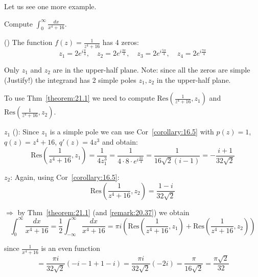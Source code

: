 Let us see one more example.
\begin{example}\label{example:24.2}
    Compute $\int_0^{\infty} \frac{dx}{x^4 + 16}$.
    
    \begin{soln}
    
    (\verifythis) The function $f(z) = \frac{1}{z^4 + 16}$ has 4 zeros:
\[
z_1 = 2e^{i \frac{\pi}{4}}, \quad z_2 = 2e^{i \frac{3\pi}{4}}, \quad z_3 = 2e^{i \frac{5\pi}{4}}, \quad z_4 = 2e^{i \frac{7\pi}{4}}
\]

Only $z_1$ and $z_2$ are in the upper-half plane. Note: since all the zeros are simple (Justify!) the integrand has 2 simple poles $z_1, z_2$ in the upper-half plane.

To use Thm~\ref{theorem:21.1} we need to compute $\text{Res} \left( \frac{1}{z^4 + 16}, z_1 \right)$ and $\text{Res} \left( \frac{1}{z^4 + 16}, z_2 \right)$.

$z_1$ (\verifythis): Since $z_1$ is a simple pole we can use Cor~\ref{corollary:16.5} with $p(z) = 1$, $q(z) = z^4 + 16$, $q'(z) = 4z^3$ and obtain:
\[
\text{Res} \left( \frac{1}{z^4 + 16}, z_1 \right) = \frac{1}{4z_1^3} = \frac{1}{4 \cdot 8 \cdot e^{i \frac{3\pi}{4}}} = \frac{1}{16\sqrt{2} (i-1)} = -\frac{i+1}{32\sqrt{2}}
\]

$z_2$: Again, using Cor~\ref{corollary:16.5}:
\[
\text{Res} \left( \frac{1}{z^4 + 16}, z_2 \right) = \frac{1-i}{32\sqrt{2}}
\]

$\Rightarrow$ by Thm~\ref{theorem:21.1} (and \ref{remark:20.37}) we obtain
\[
\int_0^{\infty} \frac{dx}{x^4 + 16} = \frac{1}{2} \int_{-\infty}^{\infty} \frac{dx}{x^4 + 16} = \pi i \left( \text{Res} \left( \frac{1}{z^4 + 16}, z_1 \right) + \text{Res} \left( \frac{1}{z^4 + 16}, z_2 \right) \right)
\]
\end{soln}
\end{example}

\begin{remark}
    since $\frac{1}{x^4 + 16}$ is an even function
    \[
        = \frac{\pi i}{32\sqrt{2}} (-i - 1 + 1 - i) = \frac{\pi i}{32\sqrt{2}} (-2i) = \frac{\pi}{16\sqrt{2}} = \frac{\pi \sqrt{2}}{32}
        \]
    \end{remark}

